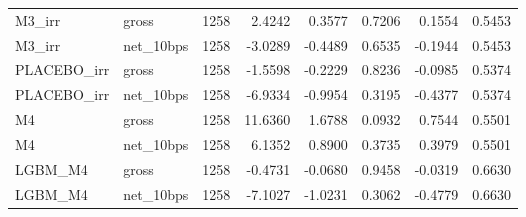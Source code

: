 \begin{tabular}{llrrrrrr}
M3\_irr & gross & 1258 & 2.4242 & 0.3577 & 0.7206 & 0.1554 & 0.5453 \\
M3\_irr & net\_10bps & 1258 & -3.0289 & -0.4489 & 0.6535 & -0.1944 & 0.5453 \\
PLACEBO\_irr & gross & 1258 & -1.5598 & -0.2229 & 0.8236 & -0.0985 & 0.5374 \\
PLACEBO\_irr & net\_10bps & 1258 & -6.9334 & -0.9954 & 0.3195 & -0.4377 & 0.5374 \\
M4 & gross & 1258 & 11.6360 & 1.6788 & 0.0932 & 0.7544 & 0.5501 \\
M4 & net\_10bps & 1258 & 6.1352 & 0.8900 & 0.3735 & 0.3979 & 0.5501 \\
LGBM\_M4 & gross & 1258 & -0.4731 & -0.0680 & 0.9458 & -0.0319 & 0.6630 \\
LGBM\_M4 & net\_10bps & 1258 & -7.1027 & -1.0231 & 0.3062 & -0.4779 & 0.6630 \\
\bottomrule
\end{tabular}
